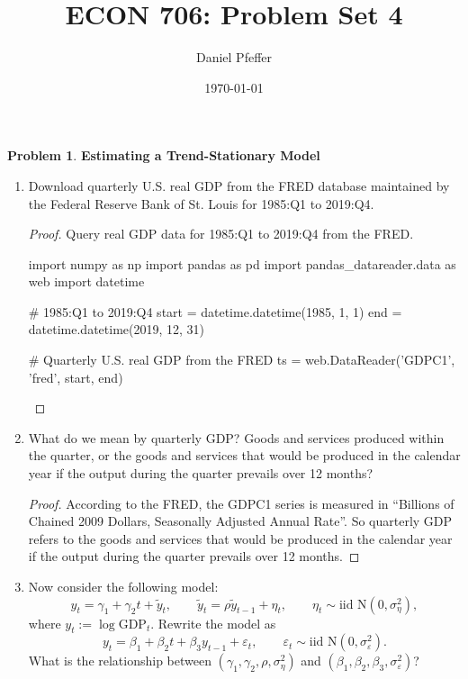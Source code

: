 \documentclass[oneside,reqno]{amsart}
\title{ECON 706: Problem Set 4}
\author{Daniel Pfeffer}
\date{\today}
\newcommand{\eps}{\varepsilon}
\theoremstyle{definition}
\newtheorem{prob}{Problem}
\begin{document}
\maketitle

\begin{prob}\label{prob1}
\textbf{Estimating a Trend-Stationary Model}
\end{prob}

\begin{enumerate}
\item
Download quarterly U.S. real GDP from the FRED database maintained by the Federal Reserve Bank of St. Louis for 1985:Q1 to 2019:Q4.

\begin{proof}
Query real GDP data for 1985:Q1 to 2019:Q4 from the FRED. 
\begin{python3code}
import numpy as np
import pandas as pd
import pandas_datareader.data as web
import datetime

# 1985:Q1 to 2019:Q4
start = datetime.datetime(1985, 1, 1)
end = datetime.datetime(2019, 12, 31)

# Quarterly U.S. real GDP from the FRED
ts = web.DataReader('GDPC1', 'fred', start, end)
\end{python3code}
\end{proof}

\item
What do we mean by quarterly GDP? Goods and services produced within the quarter, or the goods and services that would be produced in the calendar year if the output during the quarter prevails over 12 months?

\begin{proof}
According to the FRED, the GDPC1 series is measured in ``Billions of Chained 2009 Dollars, Seasonally Adjusted Annual Rate''. So quarterly GDP refers to the goods and services that would be produced in the calendar year if the output during the quarter prevails over 12 months.
\end{proof}


\item
Now consider the following model:
\begin{equation}\label{eq:1}
	y_t = \gamma_1  + \gamma_2 t + \tilde y_t, 
	\qquad 
	\tilde y_t = \rho  \tilde y_{t-1} + \eta_t,
	\qquad 
	\eta_t \sim \text{iid N} (0, \sigma_\eta^2),
\end{equation}
where $y_t := \log \text{GDP}_t$. Rewrite the model as 
\begin{equation}\label{eq:2}
	y_t = \beta_1 + \beta_2 t + \beta_3 y_{t-1} + \eps_t,
	\qquad 
	\eps_t \sim \text{iid N}(0, \sigma_\eps^2).
\end{equation}
What is the relationship between $(\gamma_1, \gamma_2, \rho, \sigma_\eta^2)$ and $(\beta_1, \beta_2, \beta_3, \sigma_\eps^2)$?


\end{enumerate}
\end{document}

